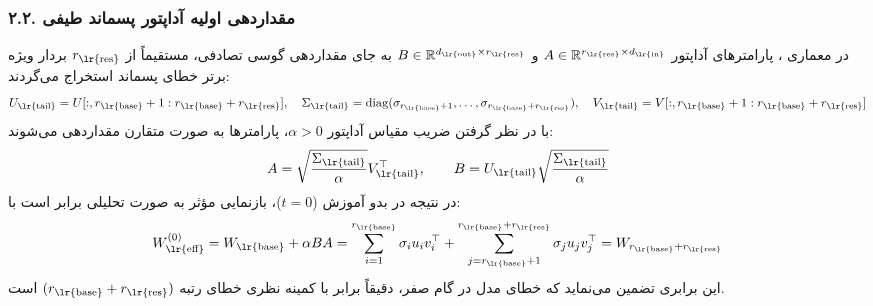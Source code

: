\subsubsection*{۲.۲. مقداردهی اولیه آداپتور پسماند طیفی }
در معماری ، پارامترهای آداپتور $A \in \mathbb{R}^{r_{\text{\lr{res}}} \times d_{\text{\lr{in}}}}$ و $B \in \mathbb{R}^{d_{\text{\lr{out}}} \times r_{\text{\lr{res}}}}$ به جای مقداردهی گوسی تصادفی، مستقیماً از $r_{\text{\lr{res}}}$ بردار ویژه برتر خطای پسماند استخراج می‌گردند:
\begin{equation}
U_{\text{\lr{tail}}} = U[:, r_{\text{\lr{base}}}+1 : r_{\text{\lr{base}}}+r_{\text{\lr{res}}}], \quad \Sigma_{\text{\lr{tail}}} = \operatorname{diag}(\sigma_{r_{\text{\lr{base}}}+1}, \dots, \sigma_{r_{\text{\lr{base}}}+r_{\text{\lr{res}}}}), \quad V_{\text{\lr{tail}}} = V[:, r_{\text{\lr{base}}}+1 : r_{\text{\lr{base}}}+r_{\text{\lr{res}}}]
\end{equation}
با در نظر گرفتن ضریب مقیاس آداپتور $\alpha > 0$، پارامترها به صورت متقارن مقداردهی می‌شوند:
\begin{equation}
A = \sqrt{\frac{\Sigma_{\text{\lr{tail}}}}{\alpha}} V_{\text{\lr{tail}}}^\top, \qquad B = U_{\text{\lr{tail}}} \sqrt{\frac{\Sigma_{\text{\lr{tail}}}}{\alpha}}
\end{equation}
در نتیجه در بدو آموزش ($t = 0$)، بازنمایی مؤثر به صورت تحلیلی برابر است با:
\begin{equation}
W_{\text{\lr{eff}}}^{(0)} = W_{\text{\lr{base}}} + \alpha B A = \sum_{i=1}^{r_{\text{\lr{base}}}} \sigma_i u_i v_i^\top + \sum_{j=r_{\text{\lr{base}}}+1}^{r_{\text{\lr{base}}}+r_{\text{\lr{res}}}} \sigma_j u_j v_j^\top = W_{r_{\text{\lr{base}}}+r_{\text{\lr{res}}}}
\end{equation}
این برابری تضمین می‌نماید که خطای مدل در گام صفر، دقیقاً برابر با کمینه نظری خطای رتبه $(r_{\text{\lr{base}}}+r_{\text{\lr{res}}})$ است.

